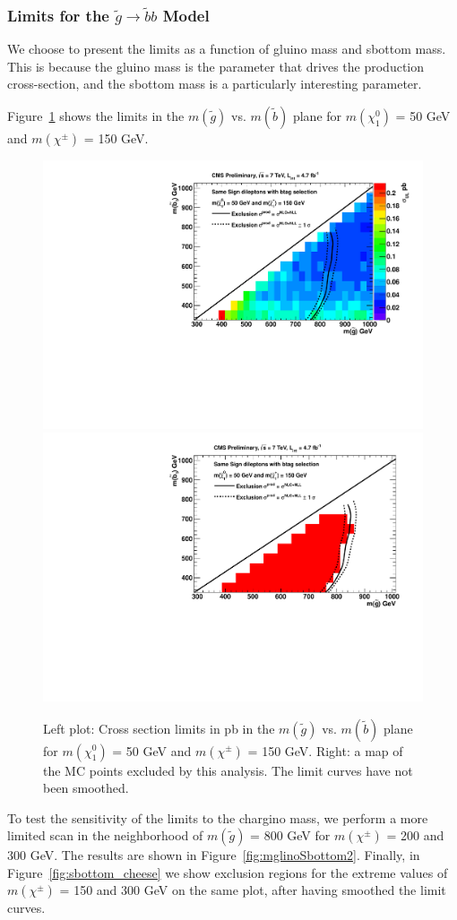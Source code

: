 \subsubsection{Limits for the $\widetilde{g} \to \widetilde{b}b$ Model}
\label{sec:gbblimits}

We choose to present the limits as a function of gluino mass and
sbottom mass.  This is because the gluino mass is the parameter
that drives the production cross-section, and the sbottom mass
is a particularly interesting parameter.

Figure~\ref{fig:mglinoSbottom} shows the limits in 
the $m(\widetilde{g})$ vs. 
$m(\widetilde{b})$ plane
for $m(\chi_1^0)$ = 50 GeV and 
$m(\chi^{\pm})$ = 150 GeV. 



\begin{figure}[htb]
\begin{center}
\includegraphics[width=0.49\linewidth]{figs/B2_LimitsOnCarpet_150.pdf}
\includegraphics[width=0.49\linewidth]{figs/B2_ExcludedRegionMap_150.pdf}
\caption{Left plot: Cross section limits in pb in the $m(\widetilde{g})$ vs. 
$m(\widetilde{b})$ plane
for $m(\chi_1^0)$ = 50 GeV and 
$m(\chi^{\pm})$ = 150 GeV.
Right: a map of the MC points excluded by this analysis.
The limit curves have not been smoothed.
\label{fig:mglinoSbottom}}
\end{center}
\end{figure}

To test the sensitivity of the limits to the chargino mass, 
we perform a more limited scan in the neighborhood of 
$m(\widetilde{g})$ = 800 GeV for $m(\chi^{\pm})$ = 200 and 
300 GeV.  The results are shown in Figure~\ref{fig:mglinoSbottom2}.
Finally, in Figure~\ref{fig:sbottom_cheese} we show exclusion
regions for the extreme values of 
$m(\chi^{\pm})$ = 150 and 300 GeV on the same plot, after 
having smoothed the limit curves.

